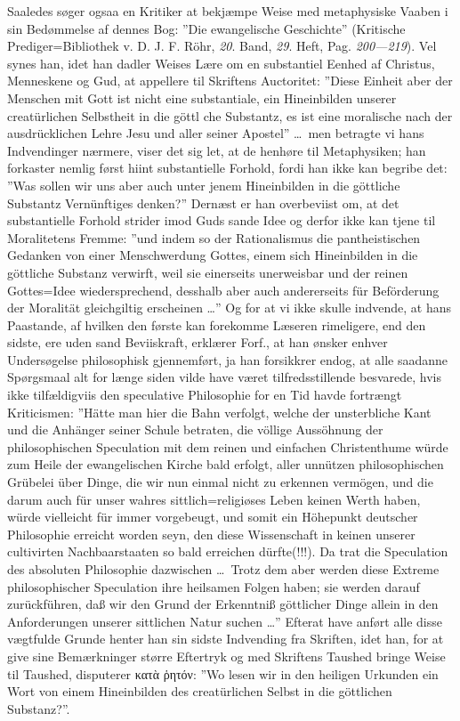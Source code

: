 \documentclass[12pt]{book}
\begin{document}
{Saaledes søger ogsaa en Kritiker at bekjæmpe Weise med metaphysiske Vaaben i
sin Bedømmelse af dennes Bog: ”Die ewangelische Geschichte” (Kritische
Prediger=Bibliothek v. D. J. F. Röhr, \textit{20}. Band, \textit{29}. Heft,
Pag. \textit{200---219}). Vel synes han, idet han dadler Weises Lære om en
substantiel Eenhed af Christus, Menneskene og Gud, at appellere til Skriftens
Auctoritet: ”Diese Einheit aber der Menschen mit Gott ist nicht eine
substantiale, ein Hineinbilden unserer creatürlichen Selbstheit in die göttl
che Substantz, es ist eine moralische nach der ausdrücklichen Lehre Jesu und
aller seiner Apostel” \ldots\ men betragte vi hans Indvendinger nærmere, viser
det sig let, at de henhøre til Metaphysiken; han forkaster nemlig først hiint
substantielle Forhold, fordi han ikke kan begribe det: ”Was sollen wir uns
aber auch unter jenem Hineinbilden in die göttliche Substantz Vernünftiges
denken?” Dernæst er han overbeviist om, at det substantielle Forhold strider
imod Guds sande Idee og derfor ikke kan tjene til Moralitetens Fremme: ”und
indem so der Rationalismus die pantheistischen Gedanken von einer
Menschwerdung Gottes, einem sich Hineinbilden in die göttliche Substanz
verwirft, weil sie einerseits unerweisbar und der reinen Gottes=Idee
wiedersprechend, desshalb aber auch andererseits für Beförderung der Moralität
gleichgiltig erscheinen \ldots” Og for at vi ikke skulle indvende, at hans
Paastande, af hvilken den første kan forekomme Læseren rimeligere, end den
sidste, ere uden sand Beviiskraft, erklærer Forf., at han ønsker enhver
Undersøgelse philosophisk gjennemført, ja han forsikkrer endog, at alle
saadanne Spørgsmaal alt for længe siden vilde have været tilfredsstillende
besvarede, hvis ikke tilfældigviis den speculative Philosophie for en Tid
havde fortrængt Kriticismen: ”Hätte man hier die Bahn verfolgt, welche der
unsterbliche Kant und die Anhänger seiner Schule betraten, die völlige
Aussöhnung der philosophischen Speculation mit dem reinen und einfachen
Christenthume würde zum Heile der ewangelischen Kirche bald erfolgt, aller
unnützen philosophischen Grübelei über Dinge, die wir nun einmal nicht zu
erkennen vermögen, und die darum auch für unser wahres sittlich=religiøses
Leben keinen Werth haben, würde vielleicht für immer vorgebeugt, und somit ein
Höhepunkt deutscher Philosophie erreicht worden seyn, den diese Wissenschaft
in keinen unserer cultivirten Nachbaarstaaten so bald erreichen dürfte(!!!).
Da trat die Speculation des absoluten Philosophie dazwischen \ldots\ Trotz dem
aber werden diese Extreme philosophischer Speculation ihre heilsamen Folgen
haben; sie werden darauf zurückführen, daß wir den Grund der Erkenntniß
göttlicher Dinge allein in den Anforderungen unserer sittlichen Natur suchen
\ldots” Efterat have anført alle disse vægtfulde Grunde henter han sin sidste
Indvending fra Skriften, idet han, for at give sine Bemærkninger større
Eftertryk og med Skriftens Taushed bringe Weise til Taushed, disputerer κατὰ
ῥητόν: ”Wo lesen wir in den heiligen Urkunden ein Wort von einem Hineinbilden
des creatürlichen Selbst in die göttlichen Substanz?”}.
\end{document}

